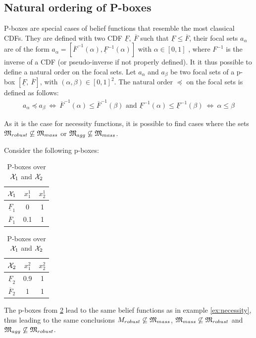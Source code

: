 \subsection{Natural ordering of P-boxes}\label{subsec:pboxes}
P-boxes are special cases of belief functions that resemble the most classical CDFs. They are defined with two CDF $\underline{F},~\overline{F}$ such that $\underline{F}\leqslant\overline{F}$, their focal sets $a_\alpha$ are of the form $a_\alpha=[\overline{F}^{-1}(\alpha), \underline{F}^{-1}(\alpha)]$ with $\alpha\in[0,1]$ \cite{destercke_unifying_2008}, where $F^{-1}$ is the inverse of a CDF (or pseudo-inverse if not properly defined). It it thus possible to define a natural order on the focal sets. Let $a_\alpha$ and $a_\beta$ be two focal sets of a p-box $[\underline{F},~\overline{F}]$, with $(\alpha,\beta)\in[0,1]^2$. The natural order $\preceq$ on the focal sets is defined as follows:
\begin{align}
    a_\alpha\preceq a_\beta ~\Leftrightarrow~ \overline{F}^{-1}(\alpha)\leqslant\overline{F}^{-1}(\beta) \text{ and } \underline{F}^{-1}(\alpha)\leqslant\underline{F}^{-1}(\beta)~\Leftrightarrow~ \alpha\leqslant\beta\label{eq:order_pbox}
\end{align}

As it is the case for necessity functions, it is possible to find cases where the sets ${\mathfrak{M}}_{robust}\not\subseteq {\mathfrak{M}}_{mass}$ or ${\mathfrak{M}}_{agg}\not\subseteq{\mathfrak{M}}_{mass}$.
\begin{example}\label{ex:pbox}
    Consider the following p-boxes:
    \begin{table}[!ht]
        \centering
        \begin{tabular}{|c|c|c|}
            \hline
            ${\mathcal{X}}_1$ & $x^1_1$ & $x^1_2$\\
            \hline\hline
            $\underline{F}_1$ & 0 & 1\\
            \hline
            $\overline{F}_1$ & 0.1 & 1\\
            \hline
        \end{tabular}
        \quad
        \begin{tabular}{|c|c|c|}
            \hline
            ${\mathcal{X}}_2$ & $x^2_1$ & $x^2_2$\\
            \hline\hline
            $\underline{F}_2$ & 0.9 & 1\\
            \hline
            $\overline{F}_2$ & 1 & 1\\
            \hline
        \end{tabular}
        \caption{P-boxes over ${\mathcal{X}}_1$ and ${\mathcal{X}}_2$}
        \label{tab:example_pbox}
    \end{table}
    The p-boxes from \ref{tab:example_pbox} lead to the same belief functions as in example \ref{ex:necessity}, thus leading to the same conclusions \ie ${M}_{robust}\not\subseteq{\mathfrak{M}}_{mass}$, ${\mathfrak{M}}_{mass}\not\subseteq{\mathfrak{M}}_{robust}$ and ${\mathfrak{M}}_{agg}\not\subseteq{\mathfrak{M}}_{robust}$.
\end{example}

